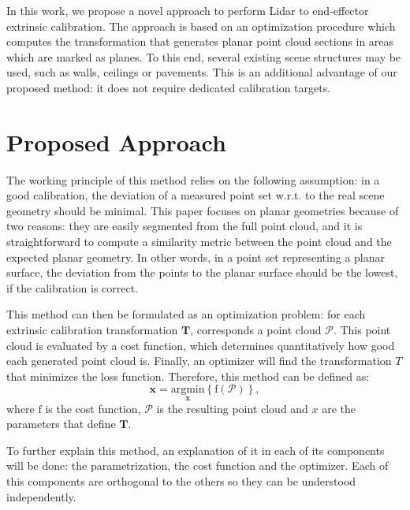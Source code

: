 \documentclass[conference]{IEEEtran}
\begin{document}
In this work, we propose a novel approach to perform Lidar to end-effector extrinsic calibration. The approach is based on an optimization procedure which computes the transformation that generates planar point cloud sections in areas which are marked as planes. To this end, several existing scene structures may be used, such as walls, ceilings or pavements. This is an additional advantage of our proposed method: it does not require dedicated calibration targets.

\section{Proposed Approach}
\label{section:proposed_approach}

The working principle of this method relies on the following assumption: in a good calibration, the deviation of a measured point set w.r.t. to the real scene geometry should be minimal. This paper focuses on planar geometries because of two reasons:  they are easily segmented from the full point cloud, and it is straightforward to compute a similarity metric between the point cloud and the expected planar geometry. In other words, in a point set representing a planar surface, the deviation from the points to the planar surface should be the lowest, if the calibration is correct.

This method can then be formulated as an optimization problem: for each extrinsic calibration transformation $\mathbf{T}$, corresponds a point cloud $\mathcal{P}$. This point cloud is evaluated by a cost function, which determines quantitatively how good each generated point cloud is. Finally, an optimizer will find the transformation $T$ that minimizes the loss function. Therefore, this method can be defined as:
%
\begin{equation}
    \mathbf{\mathbf{x}} = \underset{\mathbf{x}}{\mathrm{argmin}} \left\{ \mathrm{f}(\mathcal{P}) \right\},
\end{equation}
%
\noindent where $\mathrm{f}$ is the cost function, $\mathcal{P}$ is the resulting point cloud and $x$ are the parameters that define $\mathbf{T}$.

To further explain this method, an explanation of it in each of its components will be done: the parametrization, the cost function and the optimizer. Each of this components are orthogonal to the others so they can be understood independently.
\end{document}

